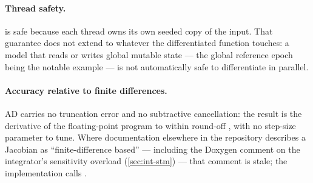 \paragraph{Thread safety.}
 is safe because each thread owns its own seeded copy of
the input. That guarantee does not extend to whatever the differentiated
function touches: a model that reads or writes global mutable state --- the
global reference epoch being the notable example --- is not automatically safe
to differentiate in parallel.

\paragraph{Accuracy relative to finite differences.}
AD carries no truncation error and no subtractive cancellation: the result is
the derivative of the floating-point program to within round-off
\citep{ieee754}, with no step-size parameter to tune. Where documentation
elsewhere in the repository describes a Jacobian as ``finite-difference
based'' --- including the Doxygen comment on the integrator's sensitivity
overload (\cref{sec:int-stm}) --- that comment is stale; the implementation
calls .
